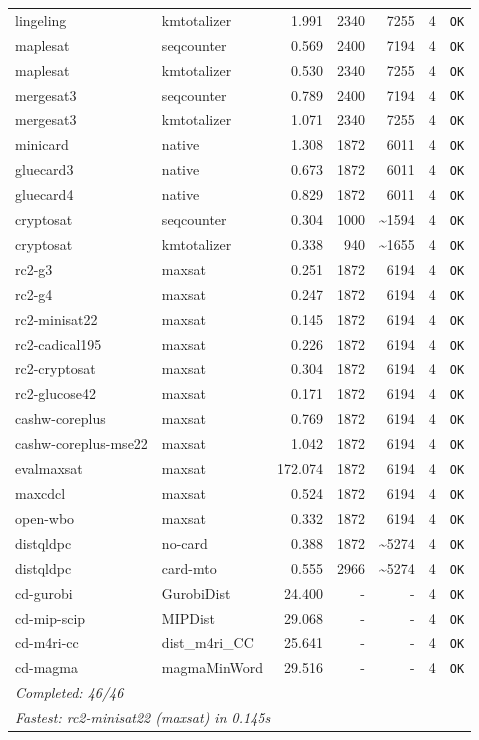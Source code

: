 \begin{longtable}{llrrrl p{}}
lingeling & kmtotalizer & 1.991 & 2340 & 7255 & 4 & \texttt{OK} \\
maplesat & seqcounter & 0.569 & 2400 & 7194 & 4 & \texttt{OK} \\
maplesat & kmtotalizer & 0.530 & 2340 & 7255 & 4 & \texttt{OK} \\
mergesat3 & seqcounter & 0.789 & 2400 & 7194 & 4 & \texttt{OK} \\
mergesat3 & kmtotalizer & 1.071 & 2340 & 7255 & 4 & \texttt{OK} \\
minicard & native & 1.308 & 1872 & 6011 & 4 & \texttt{OK} \\
gluecard3 & native & 0.673 & 1872 & 6011 & 4 & \texttt{OK} \\
gluecard4 & native & 0.829 & 1872 & 6011 & 4 & \texttt{OK} \\
cryptosat & seqcounter & 0.304 & 1000 & \textasciitilde{}1594 & 4 & \texttt{OK} \\
cryptosat & kmtotalizer & 0.338 & 940 & \textasciitilde{}1655 & 4 & \texttt{OK} \\
rc2-g3 & maxsat & 0.251 & 1872 & 6194 & 4 & \texttt{OK} \\
rc2-g4 & maxsat & 0.247 & 1872 & 6194 & 4 & \texttt{OK} \\
rc2-minisat22 & maxsat & 0.145 & 1872 & 6194 & 4 & \texttt{OK} \\
rc2-cadical195 & maxsat & 0.226 & 1872 & 6194 & 4 & \texttt{OK} \\
rc2-cryptosat & maxsat & 0.304 & 1872 & 6194 & 4 & \texttt{OK} \\
rc2-glucose42 & maxsat & 0.171 & 1872 & 6194 & 4 & \texttt{OK} \\
cashw-coreplus & maxsat & 0.769 & 1872 & 6194 & 4 & \texttt{OK} \\
cashw-coreplus-mse22 & maxsat & 1.042 & 1872 & 6194 & 4 & \texttt{OK} \\
evalmaxsat & maxsat & 172.074 & 1872 & 6194 & 4 & \texttt{OK} \\
maxcdcl & maxsat & 0.524 & 1872 & 6194 & 4 & \texttt{OK} \\
open-wbo & maxsat & 0.332 & 1872 & 6194 & 4 & \texttt{OK} \\
distqldpc & no-card & 0.388 & 1872 & \textasciitilde{}5274 & 4 & \texttt{OK} \\
distqldpc & card-mto & 0.555 & 2966 & \textasciitilde{}5274 & 4 & \texttt{OK} \\
cd-gurobi & GurobiDist & 24.400 & - & - & 4 & \texttt{OK} \\
cd-mip-scip & MIPDist & 29.068 & - & - & 4 & \texttt{OK} \\
cd-m4ri-cc & dist\_m4ri\_CC & 25.641 & - & - & 4 & \texttt{OK} \\
cd-magma & magmaMinWord & 29.516 & - & - & 4 & \texttt{OK} \\
\midrule
\multicolumn{7}{l}{\textit{Completed: 46/46}} \\
\multicolumn{7}{l}{\textit{Fastest: rc2-minisat22 (maxsat) in 0.145s}} \\
\end{longtable}
